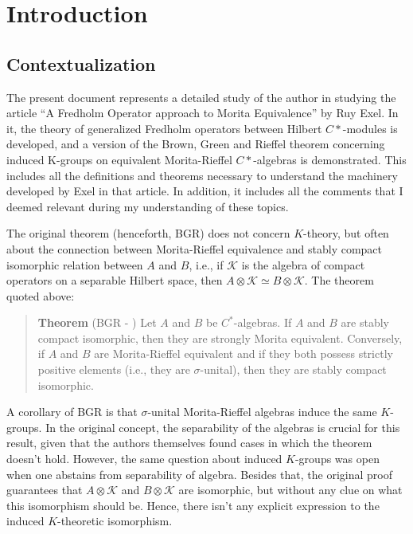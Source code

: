 \chapter*{Introduction}

\section*{Contextualization}

The present document represents a detailed study of the author in studying the article ``A Fredholm Operator approach to Morita Equivalence'' by Ruy Exel. In it, the theory of generalized Fredholm operators between Hilbert $C*$-modules is developed, and a version of the Brown, Green and Rieffel theorem concerning induced K-groups on equivalent Morita-Rieffel $C*$-algebras is demonstrated. This includes all the definitions and theorems necessary to understand the machinery developed by Exel in that article. In addition, it includes all the comments that I deemed relevant during my understanding of these topics.

The original theorem (henceforth, BGR) does not concern $K$-theory, but often about the connection between Morita-Rieffel equivalence and stably compact isomorphic relation between $A$ and $B$, i.e., if $\mathscr K$ is the algebra of compact operators on a separable Hilbert space, then $A\otimes \mathscr K \simeq B\otimes \mathscr K$. The theorem quoted above:
\begin{quote}
\textbf{Theorem} (BGR - \cite[Theorem 1.2]{brown1977morita}) 
Let $A$ and $B$ be $C^*$-algebras. If $A$ and $B$ are stably compact isomorphic, then they are strongly Morita equivalent. Conversely, if $A$ and $B$ are Morita-Rieffel equivalent and if they both possess strictly positive elements (i.e., they are $\sigma$-unital), then they are stably compact isomorphic.
\end{quote}
A corollary of BGR is that $\sigma$-unital Morita-Rieffel algebras induce the same $K$-groups. In the original concept, the separability of the algebras is crucial for this result, given that the authors themselves found cases in which the theorem doesn't hold. However, the same question about induced $K$-groups was open when one abstains from separability of algebra. Besides that, the original proof guarantees that $A\otimes \mathscr K$ and $B \otimes \mathscr K$ are isomorphic, but without any clue on what this isomorphism should be. Hence, there isn't any explicit expression to the induced $K$-theoretic isomorphism.


